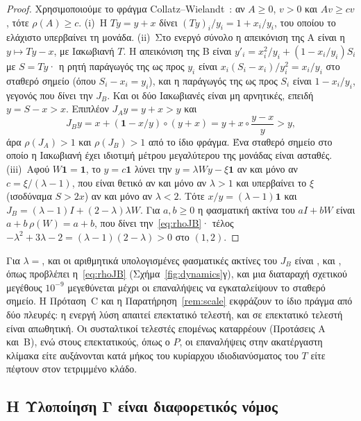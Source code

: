 \documentclass[11pt,a4paper]{article}
\theoremstyle{definition}
\theoremstyle{plain}
\newcommand{\one}{\mathbf{1}}
\begin{document}
\begin{proof}
Χρησιμοποιούμε το φράγμα Collatz--Wielandt~\cite[Θεώρ.~8.1.26]{hornjohnson13}: αν $A\ge0$, $v>0$ και $Av\ge cv$, τότε $\rho(A)\ge c$. (i)~Η $Ty=y+x$ δίνει $(Ty)_i/y_i=1+x_i/y_i$, του οποίου το ελάχιστο υπερβαίνει τη μονάδα. (ii)~Στο ενεργό σύνολο η απεικόνιση της Α είναι η $y\mapsto Ty-x$, με Ιακωβιανή $T$. Η απεικόνιση της Β είναι $y'_i=x_i^2/y_i+(1-x_i/y_i)S_i$ με $S=Ty$· η ρητή παράγωγός της ως προς $y_i$ είναι $x_i(S_i-x_i)/y_i^2=x_i/y_i$ στο σταθερό σημείο (όπου $S_i-x_i=y_i$), και η παράγωγός της ως προς $S_i$ είναι $1-x_i/y_i$, γεγονός που δίνει την $J_B$. Και οι δύο Ιακωβιανές είναι μη αρνητικές, επειδή $y=S-x>x$. Επιπλέον $J_Ay=y+x>y$ και
\[
J_By=x+(\one-x/y)\circ(y+x)=y+x\circ\frac{y-x}{y}>y,
\]
άρα $\rho(J_A)>1$ και $\rho(J_B)>1$ από το ίδιο φράγμα. Ένα σταθερό σημείο στο οποίο η Ιακωβιανή έχει ιδιοτιμή μέτρου μεγαλύτερου της μονάδας είναι ασταθές. (iii)~Αφού $W\one=\one$, το $y=c\one$ λύνει την $y=\lambda Wy-\xi\one$ αν και μόνο αν $c=\xi/(\lambda-1)$, που είναι θετικό αν και μόνο αν $\lambda>1$ και υπερβαίνει το $\xi$ (ισοδύναμα $S>2x$) αν και μόνο αν $\lambda<2$. Τότε $x/y=(\lambda-1)\one$ και $J_B=(\lambda-1)I+(2-\lambda)\lambda W$. Για $a,b\ge0$ η φασματική ακτίνα του $aI+bW$ είναι $a+b\,\rho(W)=a+b$, που δίνει την~\eqref{eq:rhoJB}· τέλος $-\lambda^2+3\lambda-2=(\lambda-1)(2-\lambda)>0$ στο $(1,2)$.
\end{proof}

Για $\lambda={}$\LamValOne{}, \LamValTwo{} και \LamValThree{} οι αριθμητικά υπολογισμένες φασματικές ακτίνες του $J_B$ είναι \RhoJBOne, \RhoJBTwo{} και \RhoJBThree, όπως προβλέπει η~\eqref{eq:rhoJB} (Σχήμα~\ref{fig:dynamics}γ), και μια διαταραχή σχετικού μεγέθους $10^{-9}$ μεγεθύνεται μέχρι οι επαναλήψεις να εγκαταλείψουν το σταθερό σημείο. Η Πρόταση~C και η Παρατήρηση~\ref{rem:scale} εκφράζουν το ίδιο πράγμα από δύο πλευρές: η ενεργή λύση απαιτεί επεκτατικό τελεστή, και σε επεκτατικό τελεστή είναι απωθητική. Οι συσταλτικοί τελεστές επομένως καταρρέουν (Προτάσεις A και~B), ενώ στους επεκτατικούς, όπως ο $P$, οι επαναλήψεις στην ακατέργαστη κλίμακα είτε αυξάνονται κατά μήκος του κυρίαρχου ιδιοδιανύσματος του $T$ είτε πέφτουν στον τετριμμένο κλάδο.

\subsection{Η Υλοποίηση Γ είναι διαφορετικός νόμος}
\end{document}
